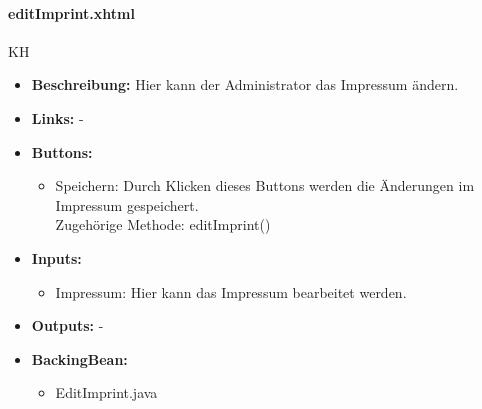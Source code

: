 				\paragraph{editImprint.xhtml}
					KH\\
					\begin{itemize}
						\item \textbf{Beschreibung:} Hier kann der Administrator das Impressum ändern.
						\item \textbf{Links:} -
						\item \textbf{Buttons:}
							\begin{itemize}
								\item Speichern: Durch Klicken dieses Buttons werden die Änderungen im Impressum gespeichert. \\ Zugehörige Methode: editImprint()
							\end{itemize}
						\item \textbf{Inputs:}
							\begin{itemize}
								\item Impressum: Hier kann das Impressum bearbeitet werden.
							\end{itemize}
						\item \textbf{Outputs:} -
						\item \textbf{BackingBean:}
							\begin{itemize}
								\item EditImprint.java				
							\end{itemize}
					\end{itemize}
				

